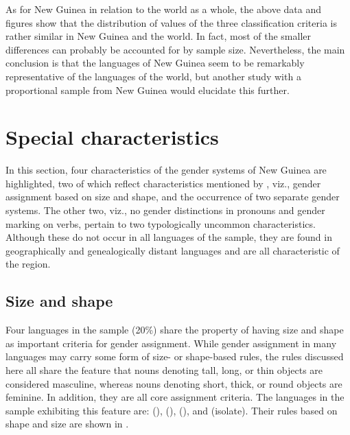 \documentclass[output=collectionpaper]{langsci/langscibook}
\begin{document}
As for New Guinea in relation to the world as a whole, the above data and figures show that the distribution of values of the three classification criteria is rather similar in New Guinea and the world. In fact, most of the smaller differences can probably be accounted for by sample size. Nevertheless, the main conclusion is that the languages of New Guinea seem to be remarkably representative of the languages of the world, but another study with a proportional sample from New Guinea would elucidate this further.

\section{Special characteristics}

In this section, four characteristics of the gender systems of New Guinea are highlighted, two of which reflect characteristics mentioned by \citet{Foley2000}, viz., gender assignment based on size and shape, and the occurrence of two separate gender systems. The other two, viz., no gender distinctions in pronouns and gender marking on verbs, pertain to two typologically uncommon characteristics.  Although these do not occur in all languages of the sample, they are found in geographically and genealogically distant languages and are all characteristic of the region.

\subsection{ Size and shape}
\label{sec:Svard:5.1}
Four languages in the sample (20\%) share the property of having size and shape as important criteria for gender assignment. While gender assignment in many languages may carry some form of size- or shape-based rules, the rules discussed here all share the feature that nouns denoting tall, long, or thin objects are considered masculine, whereas nouns denoting short, thick, or round objects are feminine. In addition, they are all core assignment criteria. The languages in the sample exhibiting this feature are:  (),  (),  (), and  (isolate). Their rules based on shape and size are shown in .
\end{document}
